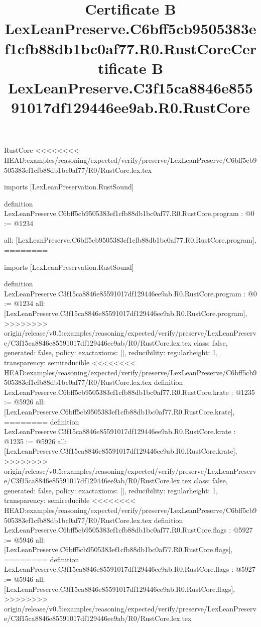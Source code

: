 \begin{lexlean}{RustCore}
<<<<<<<< HEAD:examples/reasoning/expected/verify/preserve/LexLeanPreserve/C6bff5cb9505383ef1cfb88db1bc0af77/R0/RustCore.lex.tex
\title{Certificate B LexLeanPreserve.C6bff5cb9505383ef1cfb88db1bc0af77.R0.RustCore}
\begin{coremodule}
imports [LexLeanPreservation.RustSound]

definition LexLeanPreserve.C6bff5cb9505383ef1cfb88db1bc0af77.R0.RustCore.program : @0 := @1234 {
  all: [LexLeanPreserve.C6bff5cb9505383ef1cfb88db1bc0af77.R0.RustCore.program],
========
\title{Certificate B LexLeanPreserve.C3f15ca8846e85591017df129446ee9ab.R0.RustCore}
\begin{coremodule}
imports [LexLeanPreservation.RustSound]

definition LexLeanPreserve.C3f15ca8846e85591017df129446ee9ab.R0.RustCore.program : @0 := @1234 {
  all: [LexLeanPreserve.C3f15ca8846e85591017df129446ee9ab.R0.RustCore.program],
>>>>>>>> origin/release/v0.5:examples/reasoning/expected/verify/preserve/LexLeanPreserve/C3f15ca8846e85591017df129446ee9ab/R0/RustCore.lex.tex
  class: false,
  generated: false,
  policy: exact{axioms: []},
  reducibility: regular{height: 1},
  transparency: semireducible
}
<<<<<<<< HEAD:examples/reasoning/expected/verify/preserve/LexLeanPreserve/C6bff5cb9505383ef1cfb88db1bc0af77/R0/RustCore.lex.tex
definition LexLeanPreserve.C6bff5cb9505383ef1cfb88db1bc0af77.R0.RustCore.krate : @1235 := @5926 {
  all: [LexLeanPreserve.C6bff5cb9505383ef1cfb88db1bc0af77.R0.RustCore.krate],
========
definition LexLeanPreserve.C3f15ca8846e85591017df129446ee9ab.R0.RustCore.krate : @1235 := @5926 {
  all: [LexLeanPreserve.C3f15ca8846e85591017df129446ee9ab.R0.RustCore.krate],
>>>>>>>> origin/release/v0.5:examples/reasoning/expected/verify/preserve/LexLeanPreserve/C3f15ca8846e85591017df129446ee9ab/R0/RustCore.lex.tex
  class: false,
  generated: false,
  policy: exact{axioms: []},
  reducibility: regular{height: 1},
  transparency: semireducible
}
<<<<<<<< HEAD:examples/reasoning/expected/verify/preserve/LexLeanPreserve/C6bff5cb9505383ef1cfb88db1bc0af77/R0/RustCore.lex.tex
definition LexLeanPreserve.C6bff5cb9505383ef1cfb88db1bc0af77.R0.RustCore.flags : @5927 := @5946 {
  all: [LexLeanPreserve.C6bff5cb9505383ef1cfb88db1bc0af77.R0.RustCore.flags],
========
definition LexLeanPreserve.C3f15ca8846e85591017df129446ee9ab.R0.RustCore.flags : @5927 := @5946 {
  all: [LexLeanPreserve.C3f15ca8846e85591017df129446ee9ab.R0.RustCore.flags],
>>>>>>>> origin/release/v0.5:examples/reasoning/expected/verify/preserve/LexLeanPreserve/C3f15ca8846e85591017df129446ee9ab/R0/RustCore.lex.tex
}}}
\end{coremodule}}
\end{coremodule}
\end{lexlean}

